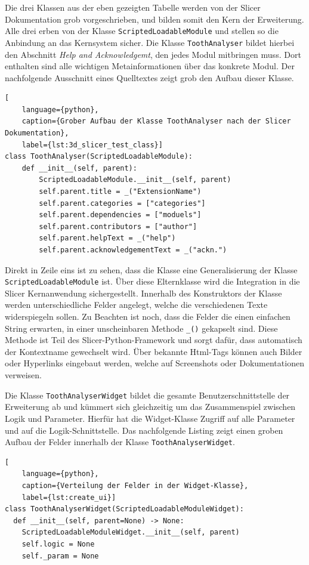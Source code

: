 Die drei Klassen aus der eben gezeigten Tabelle werden von der Slicer Dokumentation
grob vorgeschrieben, und bilden somit den Kern der Erweiterung. Alle drei erben von
der Klasse \texttt{ScriptedLoadableModule} und stellen so die Anbindung an das
Kernsystem sicher. Die Klasse \texttt{ToothAnalyser} bildet hierbei den
Abschnitt \textit{Help and Acknowledgemt}, den jedes Modul mitbringen muss. Dort
enthalten sind alle wichtigen Metainformationen über das konkrete Modul. Der
nachfolgende Ausschnitt eines Quelltextes zeigt grob den Aufbau dieser Klasse.

\begin{lstlisting}[
    language={python},
    caption={Grober Aufbau der Klasse ToothAnalyser nach der Slicer Dokumentation},
    label={lst:3d_slicer_test_class}]
class ToothAnalyser(ScriptedLoadableModule):
    def __init__(self, parent):
	    ScriptedLoadableModule.__init__(self, parent)
	    self.parent.title = _("ExtensionName")
	    self.parent.categories = ["categories"]
	    self.parent.dependencies = ["moduels"]
	    self.parent.contributors = ["author"]
	    self.parent.helpText = _("help")
	    self.parent.acknowledgementText = _("ackn.")
\end{lstlisting}

Direkt in Zeile eins ist zu sehen, dass die Klasse eine Generalisierung der
Klasse \texttt{ScriptedLoadableModule} ist. Über diese Elternklasse wird die
Integration in die Slicer Kernanwendung sichergestellt. Innerhalb des Konstruktors
der Klasse werden unterschiedliche Felder angelegt, welche die verschiedenen
Texte widerspiegeln sollen. Zu Beachten ist noch, dass die Felder die einen
einfachen String erwarten, in einer unscheinbaren Methode \texttt{\_()}
gekapselt sind. Diese Methode ist Teil des Slicer-Python-Framework und sorgt dafür,
dass automatisch der Kontextname gewechselt wird. Über bekannte Html-Tags können
auch Bilder oder Hyperlinks eingebaut werden, welche auf Screenshots oder
Dokumentationen verweisen.

Die Klasse \texttt{ToothAnalyserWidget} bildet die gesamte Benutzerschnittstelle
der Erweiterung ab und kümmert sich gleichzeitig um das Zusammenspiel zwischen Logik
und Parameter. Hierfür hat die Widget-Klasse Zugriff auf alle Parameter und auf
die Logik-Schnittstelle. Das nachfolgende Listing zeigt einen groben Aufbau der Felder
innerhalb der Klasse \texttt{ToothAnalyserWidget}.

\begin{lstlisting}[
    language={python},
    caption={Verteilung der Felder in der Widget-Klasse},
    label={lst:create_ui}]
class ToothAnalyserWidget(ScriptedLoadableModuleWidget):
  def __init__(self, parent=None) -> None:
    ScriptedLoadableModuleWidget.__init__(self, parent)
    self.logic = None
    self._param = None
\end{lstlisting}

